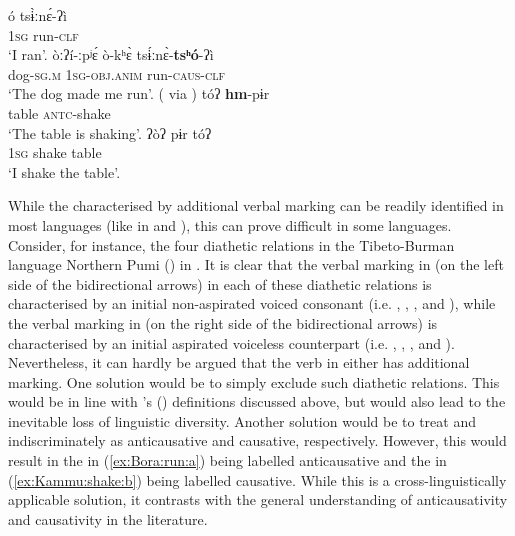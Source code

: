 \ea {} \citep[144]{thiesen:weber:2012}
\ea\label{ex:Bora:run:a}
	\gll	ó				 tsɨ̀ːnɛ́-ʔì		\\
			\textsc{1sg}	run-\textsc{clf}	\\
	\glt	‘I ran’.
\ex\label{ex:Bora:run:b}
	\gll	òːʔí-ːpʲɛ́			ò-kʰɛ̀					 tsɨ́ːnɛ̀-\textbf{tsʰó}-ʔì	 \\
			dog-\textsc{sg.m}	 \textsc{1sg-obj.anim}	run-\textsc{caus-clf}		\\
	\glt	‘The dog made me run’.
	\z 
\z
\ea {} (\citealt[111]{svantesson:1983} via \citealt[49]{zuniga:kittila:2019})
\ea\label{ex:Kammu:shake:a}
	\gll	tóʔ		\textbf{hm}-pɨr		\\
			table	\textsc{antc}-shake	\\
	\glt	‘The table is shaking’.
\ex\label{ex:Kammu:shake:b}
	\gll	ʔòʔ 			pɨr 	tóʔ 	\\
			\textsc{1sg}	shake	table	\\
	\glt	‘I shake the table’.
	\z 
\z

While the  characterised by additional verbal marking can be readily identified in most languages (like in  and ), this can prove difficult in some languages. Consider, for instance, the four diathetic relations in the Tibeto-Burman language Northern Pumi () in . It is clear that the verbal marking in  (on the left side of the bidirectional arrows) in each of these diathetic relations is characterised by an initial non-aspirated voiced consonant (i.e. , , , and ), while the verbal marking in  (on the right side of the bidirectional arrows) is characterised by an initial aspirated voiceless counterpart (i.e. , , , and ). Nevertheless, it can hardly be argued that the verb in either  has additional marking. One solution would be to simply exclude such diathetic relations. This would be in line with \citeauthor{kulikov:2010}’s (\citeyear{kulikov:2010}) definitions discussed above, but would also lead to the inevitable loss of linguistic diversity. Another solution would be to treat  and  indiscriminately as anticausative and causative, respectively. However, this would result in the   in (\ref{ex:Bora:run:a}) being labelled anticausative and the   in (\ref{ex:Kammu:shake:b}) being labelled causative. While this is a cross-linguistically applicable solution, it contrasts with the general understanding of anticausativity and causativity in the literature. 

